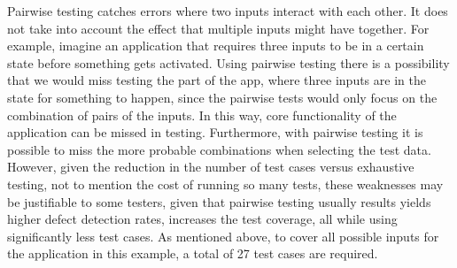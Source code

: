 Pairwise testing catches errors where two inputs interact with each other.
It does not take into account the effect that multiple inputs might have 
together. For example, imagine an application that requires three inputs to
be in a certain state before something gets activated. Using pairwise testing
there is a possibility that we would miss testing the part of the app,
where three inputs are in the state for something to happen, since
the pairwise tests would only focus on the combination of pairs of the inputs.
In this way, core functionality of the application can be missed in testing.
Furthermore, with pairwise testing it is possible to miss the more 
probable combinations when selecting the test data. However, given the reduction
in the number of test cases versus exhaustive testing, not to mention the
cost of running so many tests, these weaknesses may be justifiable to some
testers, given that pairwise testing usually results yields higher defect
detection rates, increases the test coverage, all while using significantly
less test cases. As mentioned above, to cover all possible inputs for the
application in this example, a total of 27 test cases are required. 

